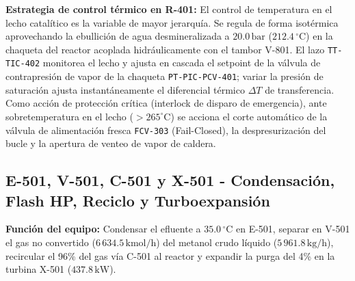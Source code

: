 \documentclass[10pt,letterpaper]{article}
\begin{document}
\textbf{Estrategia de control térmico en R-401:} El control de temperatura en el lecho catalítico es la variable de mayor jerarquía. Se regula de forma isotérmica aprovechando la ebullición de agua desmineralizada a $20.0\,\text{bar}$ ($212.4\,^\circ\text{C}$) en la chaqueta del reactor acoplada hidráulicamente con el tambor V-801. El lazo \texttt{TT-TIC-402} monitorea el lecho y ajusta en cascada el setpoint de la válvula de contrapresión de vapor de la chaqueta \texttt{PT-PIC-PCV-401}; variar la presión de saturación ajusta instantáneamente el diferencial térmico $\Delta T$ de transferencia. Como acción de protección crítica (interlock de disparo de emergencia), ante sobretemperatura en el lecho ($>265^\circ\text{C}$) se acciona el corte automático de la válvula de alimentación fresca \texttt{FCV-303} (Fail-Closed), la despresurización del bucle y la apertura de venteo de vapor de caldera.

\subsection{E-501, V-501, C-501 y X-501 - Condensación, Flash HP, Reciclo y Turboexpansión}
\textbf{Función del equipo:} Condensar el efluente a $35.0\,^\circ\text{C}$ en E-501, separar en V-501 el gas no convertido ($6\,634.5\,\text{kmol/h}$) del metanol crudo líquido ($5\,961.8\,\text{kg/h}$), recircular el 96\% del gas vía C-501 al reactor y expandir la purga del 4\% en la turbina X-501 ($437.8\,\text{kW}$).
\end{document}
